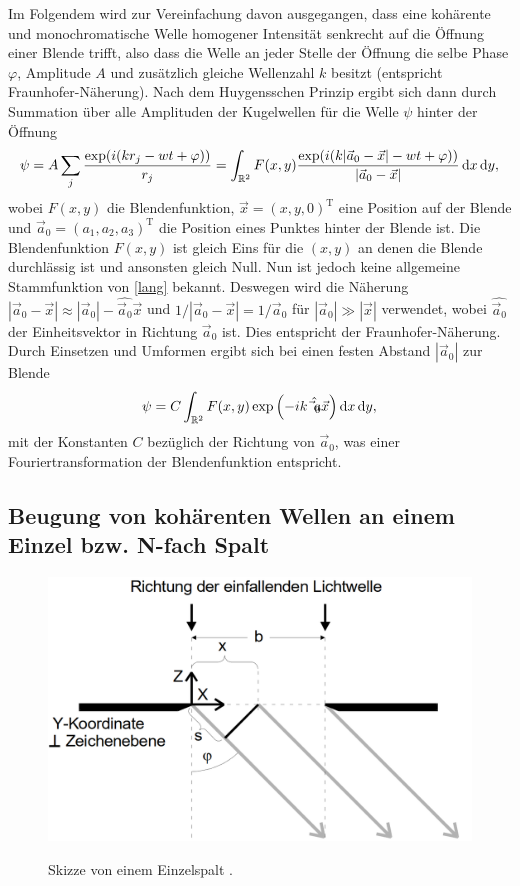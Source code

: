 Im Folgendem wird zur Vereinfachung davon ausgegangen, dass eine kohärente und monochromatische Welle homogener Intensität senkrecht auf die Öffnung einer Blende trifft, also dass die Welle an jeder Stelle der Öffnung die selbe Phase $\varphi$, Amplitude $A$ und zusätzlich gleiche Wellenzahl $k$ besitzt (entspricht Fraunhofer-Näherung). Nach dem Huygensschen Prinzip ergibt sich dann durch Summation über alle Amplituden der Kugelwellen für die Welle $\psi$ hinter der Öffnung
\begin{equation}
	\psi = A \sum \limits_j \frac{\exp(i (k r_j -w t+\varphi))}{r_j}= \int_{\mathbb{R}^2} F(x, y) \frac{\exp(i (k |\vec{a}_0-\vec{x}| -w t+\varphi))}{|\vec{a}_0-\vec{x}|} \mathop{}\!\mathrm{d} x \mathop{}\!\mathrm{d} y,\label{lang}
\end{equation}
wobei $F(x, y)$ die Blendenfunktion, $\vec{x}=(x,y,0)^\text{T}$ eine Position auf der Blende und $\vec{a}_0=(a_1,a_2,a_3)^\text{T}$ die Position eines Punktes hinter der Blende ist.
Die Blendenfunktion $F(x,y)$ ist gleich Eins für die $(x, y)$ an denen die Blende durchlässig ist und ansonsten gleich Null. Nun ist jedoch keine allgemeine Stammfunktion von \eqref{lang} bekannt. Deswegen wird die Näherung $|\vec{a}_0-\vec{x}| \approx |\vec{a}_0|- \hat{\vec{a}_0} \vec{x}$ und $1/|\vec{a}_0-\vec{x}|=1/\vec{a}_0 $ für $|\vec{a}_0|\gg |\vec{x}|$ verwendet, wobei $\hat{\vec{a}_0}$ der Einheitsvektor in Richtung $\vec{a}_0$ ist. Dies entspricht der Fraunhofer-Näherung. Durch Einsetzen und Umformen ergibt sich bei einen festen Abstand $|\vec{a}_0|$ zur Blende
\begin{equation}
	\psi = C \int_{\mathbb{R}^2} F(x,y) \exp\left(-i k \hat{\vec{a}_0} \vec{x}\right) \mathop{}\!\mathrm{d} x \mathop{}\!\mathrm{d} y, \label{eq:Integral}
\end{equation}
mit der Konstanten $C$ bezüglich der Richtung von $\vec{a}_0$, was einer Fouriertransformation der Blendenfunktion entspricht.

\subsection{Beugung von kohärenten Wellen an einem Einzel bzw. N-fach Spalt}
\begin{figure}
	\centering
	\caption{Skizze von einem Einzelspalt \cite{V406}.}
	\includegraphics[width=\linewidth-150pt,height=\textheight-150pt,keepaspectratio]{content/images/Einzelspalt.png}
	\label{fig:Einzel}
\end{figure}

